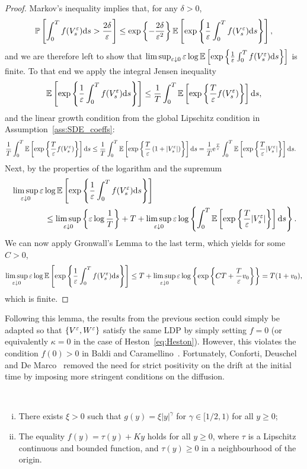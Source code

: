 \begin{proof}
Markov's inequality implies that, for any $\delta>0$,
\[
\mathbb{P}\left[ \int_0^T f(V_s^\varepsilon)\mathrm{d} s > \frac{2\delta}{\varepsilon} \right] \leq \exp\left\{ -\frac{2\delta}{\varepsilon^2}\right\}\mathbb{E}\left[ \exp\left\{ \frac 1{\varepsilon} \int_0^T f(V_s^\varepsilon)\mathrm{d} s \right\} \right],
\]
and we are therefore left to show that 
$\limsup_{\varepsilon\downarrow 0}\varepsilon\log\mathbb{E}\left[ \exp\left\{ \frac 1{\varepsilon} \int_0^T f(V_s^\varepsilon)\mathrm{d} s \right\} \right]$
is finite.
To that end we apply the integral Jensen inequality
\[
\mathbb{E}\left[ \exp\left\{ \frac 1{\varepsilon} \int_0^T f(V_s^\varepsilon)\mathrm{d} s \right\} \right] \leq \frac{1}{T} \int_0^T \mathbb{E}\left[ \exp\left\{ \frac{T}{\varepsilon} f(V_s^\varepsilon) \right\} \right] \mathrm{d} s,
\]
and the linear growth condition from the global Lipschitz condition in Assumption~\ref{ass:SDE_coeffs}:
\begin{align*}
\frac{1}{T} \int_0^T \mathbb{E}\left[ \exp\left\{ \frac{T}{\varepsilon} f(V_s^\varepsilon) \right\} \right] \mathrm{d} s &\leq \frac{1}{T} \int_0^T \mathbb{E}\left[ \exp\left\{ \frac{T}{\varepsilon}\left(1 + |V_s^\varepsilon| \right) \right\} \right] \mathrm{d} s 
= \frac{1}{T}\mathrm{e}^{\frac{T}{\varepsilon}} \int_0^T \mathbb{E}\left[ \exp\left\{ \frac{T}{\varepsilon} |V_s^\varepsilon| \right\} \right] \mathrm{d} s.
\end{align*}
Next, by the properties of the logarithm and the supremum
\begin{align*}
& \limsup_{\varepsilon\downarrow 0}\varepsilon\log\mathbb{E}\left[ \exp\left\{ \frac 1{\varepsilon} \int_0^T f(V_s^\varepsilon)\mathrm{d} s \right\} \right] \\ & \qquad \qquad \leq \limsup_{\varepsilon\downarrow 0}\left\{\varepsilon\log\frac1T\right\} + T + \limsup_{\varepsilon\downarrow 0}\varepsilon\log\left\{\int_0^T  \mathbb{E}\left[ \exp\left\{ \frac{T}{\varepsilon} |V_s^\varepsilon| \right\} \right] \mathrm{d} s\right\}.
\end{align*}
We can now apply Gronwall's Lemma to the last term, which yields for some $C>0$,
\[
\limsup_{\varepsilon\downarrow 0}\varepsilon\log\mathbb{E}\left[ \exp\left\{ \frac 1{\varepsilon} \int_0^T f(V_s^\varepsilon)\mathrm{d} s \right\} \right] \leq T + \limsup_{\varepsilon\downarrow 0}\varepsilon\log\left\{ \exp\left\{ CT + \frac{T}{\varepsilon} v_0 \right\} \right\} = T(1+v_0),
\]
which is finite.
\end{proof}
Following this lemma, the results from the previous section could simply be adapted so that $\{V^\varepsilon,W^{\varepsilon}\}$ satisfy the same LDP by simply setting $f=0$ (or equivalently $\kappa = 0$ in the case of Heston~\eqref{eq:Heston}). However, this violates the condition $f(0)>0$ in Baldi and Caramellino~\cite{Baldi2011GeneralDiffusions}. Fortunately, Conforti, Deuschel and De Marco~\cite{Conforti2015OnModels} removed the need for strict positivity on the drift at the initial time by imposing more stringent conditions on the diffusion.
\begin{assumption}\label{ass:small_time_LDP}\
\begin{enumerate}[(i)]
	\item There exists $\xi>0$ such that  $g(y)=\xi |y|^\gamma$ for $\gamma \in[1 / 2,1)$ for all $y\geq0$;
	\item The equality $f(y)=\tau(y)+ K y$ holds for all $y\geq0$, where $\tau$ is a Lipschitz continuous and bounded function, and $\tau(y) \geq 0$ in a neighbourhood of the origin.
\end{enumerate}
\end{assumption}

